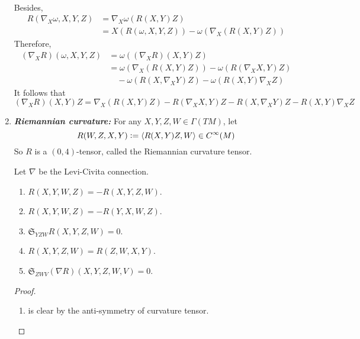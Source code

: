 \begin{enumerate}[label=\arabic{*}.]
\begin{rmk}
\begin{equation*}
\begin{aligned}
			\end{aligned}
		\end{equation*}
		Besides,
		\begin{equation*}
			\begin{aligned}
				R(\nabla_X\omega,X,Y,Z) &=\nabla_X\omega(R(X,Y)Z) \\
				&=X(R(\omega,X,Y,Z)) - \omega(\nabla_X(R(X,Y)Z))
			\end{aligned}
		\end{equation*}
		Therefore,
		\begin{equation*}
			\begin{aligned}
			  	(\nabla_XR)(\omega,X,Y,Z) &= \omega((\nabla_XR)(X,Y)Z) \\
			  	&= \omega(\nabla_X(R(X,Y)Z)) - \omega(R(\nabla_XX,Y)Z) \\
				&\quad- \omega(R(X,\nabla_XY)Z)- \omega(R(X,Y)\nabla_XZ)
			\end{aligned}  
		\end{equation*}
		It follows that
		\begin{equation*}
			(\nabla_XR)(X,Y)Z = \nabla_X(R(X,Y)Z)-R(\nabla_XX,Y)Z-R(X,\nabla_XY)Z-R(X,Y)\nabla_XZ
		\end{equation*}
	\end{rmk}

	\item \emph{\textbf{Riemannian curvature:}} For any $X,Y,Z,W \in \Gamma(TM)$, let
	\begin{equation*}
		R(W,Z,X,Y) \vcentcolon= \left\langle R(X,Y)Z,W \right\rangle \in C^\infty(M)
	\end{equation*}
	So $R$ is a $(0,4)$-tensor, called the Riemannian curvature tensor.
	\begin{prop}\label{prop:symofriemcur}
		Let $\nabla$ be the Levi-Civita connection.
		\begin{enumerate}[label=(\arabic{*})]
			\item $R(X,Y,W,Z) = -R(X,Y,Z,W)$.
			\item $R(X,Y,W,Z) = -R(Y,X,W,Z)$.
			\item $\mathfrak{S}_{YZW}R(X,Y,Z,W) = 0$.
			\item $R(X,Y,Z,W) = R(Z,W,X,Y)$.
			\item $\mathfrak{S}_{ZWV}(\nabla R)(X,Y,Z,W,V) = 0$.
		\end{enumerate}
	\end{prop}
	\begin{proof}
		\begin{enumerate}[label=(\arabic{*})]
			\item is clear by the anti-symmetry of curvature tensor.


\end{enumerate}
\end{proof}
\end{enumerate}
